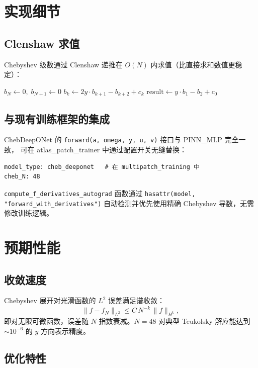 \documentclass[11pt,a4paper]{article}
\begin{document}
\section{实现细节}

\subsection{Clenshaw 求值}

Chebyshev 级数通过 Clenshaw 递推在 $O(N)$ 内求值（比直接求和数值更稳定）：
\begin{algorithmic}[1]
\State $b_{N} \gets 0,\; b_{N+1} \gets 0$
    \State $b_k \gets 2y\cdot b_{k+1} - b_{k+2} + c_k$
\EndFor
\State $\text{result} \gets y\cdot b_1 - b_2 + c_0$
\end{algorithmic}

\subsection{与现有训练框架的集成}

ChebDeepONet 的 \texttt{forward(a, omega, y, u, v)} 接口与 PINN\_MLP 完全一致，
可在 atlas\_patch\_trainer 中通过配置开关无缝替换：
\begin{verbatim}
model_type: cheb_deeponet   # 在 multipatch_training 中
cheb_N: 48
\end{verbatim}

\texttt{compute\_f\_derivatives\_autograd} 函数通过 \texttt{hasattr(model, "forward\_with\_derivatives")}
自动检测并优先使用精确 Chebyshev 导数，无需修改训练逻辑。

\section{预期性能}

\subsection{收敛速度}

Chebyshev 展开对光滑函数的 $L^2$ 误差满足谱收敛：
\begin{equation}
\|f - \hat{f}_N\|_{L^2} \leq C\,N^{-k}\,\|f\|_{H^k},
\end{equation}
即对无限可微函数，误差随 $N$ 指数衰减。$N=48$ 对典型 Teukolsky 解应能达到 $\sim 10^{-6}$ 的 $y$ 方向表示精度。

\subsection{优化特性}
\end{document}
